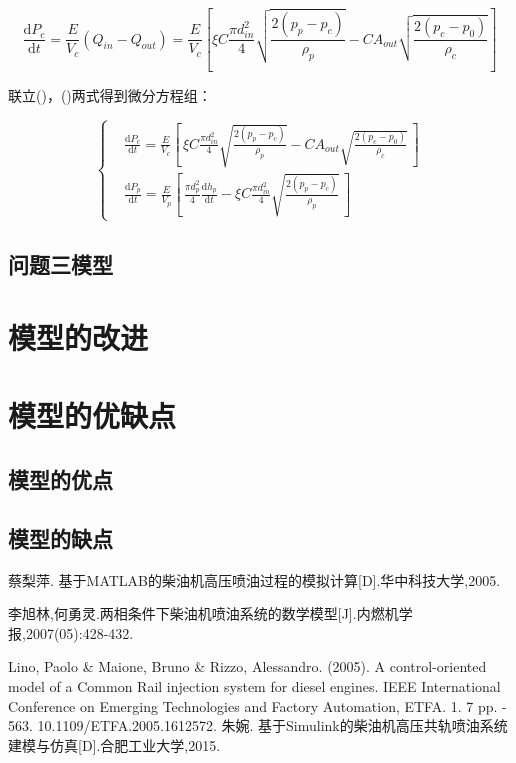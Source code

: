\documentclass[withoutpreface,bwprint]{cumcmthesis} %
\begin{document}
			\begin{equation}\frac{\mathrm{d}P_c}{\mathrm{d}t} = \frac{E}{V_c}(Q_{in} - Q_{out}) = \frac{E}{V_c} \left[ \xi C \frac{\pi d_{in}^2}{4} \sqrt{\frac{2(p_p - p_c)}{\rho_p}} - CA_{out} \sqrt{\frac{2(p_c - p_0)}{\rho_c}} \right]\end{equation}
			
			联立()，()两式得到微分方程组：
			
			\begin{equation} \left\{\begin{aligned}&\frac{\mathrm{d}P_c}{\mathrm{d}t} = \frac{E}{V_c} \left[ \, \xi C \frac{\pi d_{in}^2}{4} \sqrt{\frac{2(p_p - p_c)}{\rho_p}} - CA_{out} \sqrt{\frac{2(p_c - p_0)}{\rho_c}} \, \right] \\&\frac{\mathrm{d}P_p}{\mathrm{d}t} = \frac{E}{V_p} \left[ \, \frac{\pi d_p^2}{4}  \frac{\mathrm{d}h_p}{\mathrm{d}t} - \xi C \frac{\pi d_{in}^2}{4} \sqrt{\frac{2(p_p - p_c)}{\rho_p}} \, \right]\end{aligned}\right. \end{equation}
			\subsection{问题三模型}
			
			
			\section{模型的改进}
			
			
			\section{模型的优缺点}
			\subsection{模型的优点}
			
			\subsection{模型的缺点}
			
			
			
			\begin{thebibliography}{9}%
				 蔡梨萍. 基于MATLAB的柴油机高压喷油过程的模拟计算[D].华中科技大学,2005.
				
				李旭林,何勇灵.两相条件下柴油机喷油系统的数学模型[J].内燃机学报,2007(05):428-432.
				
				Lino, Paolo \& Maione, Bruno \& Rizzo, Alessandro. (2005). A control-oriented model of a Common Rail injection system for diesel engines. IEEE International Conference on Emerging Technologies and Factory Automation, ETFA. 1. 7 pp. - 563. 10.1109/ETFA.2005.1612572. 
				朱婉. 基于Simulink的柴油机高压共轨喷油系统建模与仿真[D].合肥工业大学,2015.
				
				
			\end{thebibliography}
			
\end{document}
